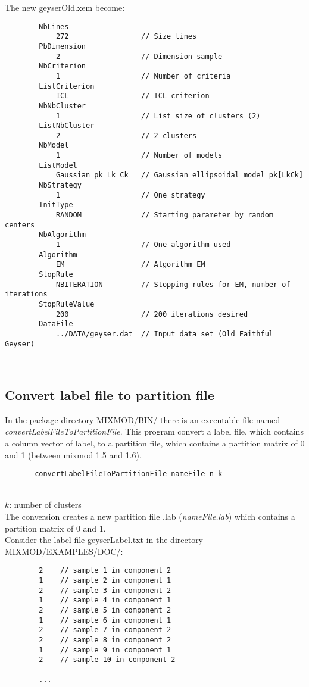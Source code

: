 {\noindent The new geyserOld.xem become:}
{\scriptsize
\begin{verbatim}
        NbLines
            272                 // Size lines
        PbDimension
            2                   // Dimension sample
        NbCriterion
            1                   // Number of criteria
        ListCriterion
            ICL                 // ICL criterion
        NbNbCluster
            1                   // List size of clusters (2)
        ListNbCluster
            2                   // 2 clusters
        NbModel
            1                   // Number of models
        ListModel
            Gaussian_pk_Lk_Ck   // Gaussian ellipsoidal model pk[LkCk]
        NbStrategy
            1                   // One strategy
        InitType
            RANDOM              // Starting parameter by random centers
        NbAlgorithm
            1                   // One algorithm used
        Algorithm
            EM                  // Algorithm EM
        StopRule
            NBITERATION         // Stopping rules for EM, number of iterations
        StopRuleValue
            200                 // 200 iterations desired
        DataFile
            ../DATA/geyser.dat  // Input data set (Old Faithful Geyser)



\end{verbatim}}

\subsection{ Convert label file to partition file}
In the package directory MIXMOD/BIN/ there is an executable file named {\em convertLabelFileToPartitionFile}. This program convert a label file, which contains a column vector of label, to a
partition file, which contains a partition matrix of 0 and 1 (between {\sc mixmod} 1.5 and 1.6).\\
{\scriptsize
\begin{verbatim}
       convertLabelFileToPartitionFile nameFile n k
\end{verbatim}}

\\
$k$: number of clusters\\
The conversion creates a new partition file .lab ({\em nameFile.lab}) which contains a partition matrix of 0
and 1.\\
Consider the label file geyserLabel.txt in the directory MIXMOD/EXAMPLES/DOC/:
{\scriptsize
\begin{verbatim}
        2    // sample 1 in component 2
        1    // sample 2 in component 1
        2    // sample 3 in component 2
        1    // sample 4 in component 1
        2    // sample 5 in component 2
        1    // sample 6 in component 1
        2    // sample 7 in component 2
        2    // sample 8 in component 2
        1    // sample 9 in component 1
        2    // sample 10 in component 2

        ...
\end{verbatim}}

